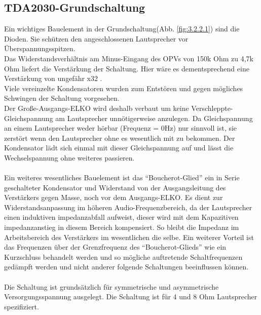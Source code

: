 \subsection{TDA2030-Grundschaltung}\label{subsec:3.2.2}
Ein wichtiges Bauelement in der Grundschaltung(Abb. \ref{fig:3.2.2.1}) sind die Dioden. Sie schützen den angeschlossenen Lautsprecher vor Überspannungsspitzen.\\
Das Widerstandsverhältnis am Minus-Eingang des OPVs von 150k Ohm zu 4,7k Ohm liefert die Verstärkung der Schaltung. Hier wäre es dementsprechend eine Verstärkung von ungefähr x32 .\\
Viele vereinzelte Kondensatoren wurden zum Entstören und gegen mögliches Schwingen der Schaltung vorgesehen.\\
Der Große-Ausgangs-ELKO wird deshalb verbaut um keine Verschleppte-Gleichspannung am Lautsprecher unnötigerweise anzulegen. Da Gleichspannung an einem Lautsprecher weder hörbar (Frequenz = 0Hz) nur sinnvoll ist, sie zerstört wenn den Lautsprecher ohne es wesentlich mit zu bekommen. Der Kondensator lädt sich einmal mit dieser Gleichspannung auf und lässt die Wechselspannung ohne weiteres passieren.\\\\
Ein weiteres wesentliches Bauelement ist das \enquote{Boucherot-Glied} ein in Serie geschalteter Kondensator und Widerstand von der Ausgangsleitung des Verstärkers gegen Masse, noch vor dem Ausgangs-ELKO. Es dient zur Widerstandsanpassung im höheren Audio-Frequenzbereich, da der Lautsprecher einen induktiven impedanzabfall aufweist, dieser wird mit dem Kapazitiven impedanzanstieg in diesem Bereich kompensiert. So bleibt die Impedanz im Arbeitsbereich des Verstärkers im wesentlichen die selbe. Ein weiterer Vorteil ist das Frequenzen über der Grenzfrequenz des \enquote{Boucherot-Glieds} wie ein Kurzschluss behandelt werden und so mögliche auftretende Schaltfrequenzen gedämpft werden und nicht anderer folgende Schaltungen beeinflussen können.\\\\
Die Schaltung ist grundsätzlich für symmetrische und asymmetrische Versorgungsspannung ausgelegt. Die Schaltung ist für 4 und 8 Ohm Lautsprecher spezifiziert.
